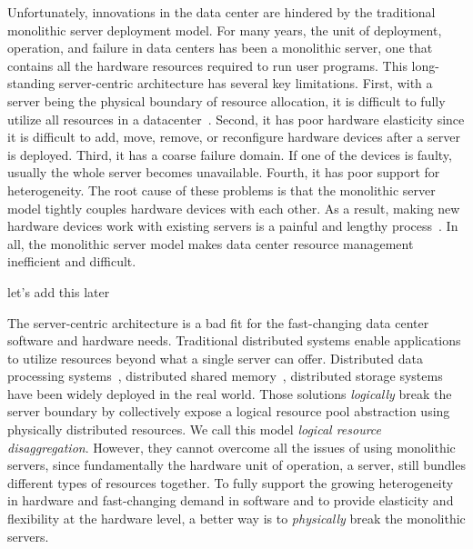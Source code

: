 Unfortunately, innovations in the data center are hindered by the traditional monolithic server deployment model.
For many years, the unit of deployment, operation, and failure in data centers
has been a monolithic server, one that contains all the hardware resources required to run user programs. 
%
This long-standing server-centric architecture has several key limitations.
First, with a server being the physical boundary of resource allocation, it is difficult to fully utilize all resources in a datacenter~\cite{LegoOS}.
Second, it has poor hardware elasticity since it is difficult to add, move, remove, or reconfigure hardware devices after a server is deployed.
Third, it has a coarse failure domain.
If one of the devices is faulty, usually the
whole server becomes unavailable.
Fourth, it has poor support for heterogeneity.
The root cause of these problems is that the monolithic server model tightly couples
hardware devices with each other.
As a result, making new hardware devices work with existing servers is a painful and lengthy process~\cite{Putnam14-FPGA}.
In all, the monolithic server model makes data center resource management inefficient and difficult.


let's add this later
\fi

The server-centric architecture is a bad fit for the fast-changing data center software and hardware needs.
Traditional distributed systems enable applications to utilize resources beyond what a single server can offer. Distributed data processing systems~\cite{Zaharia12-NSDI}, distributed shared memory~\cite{Nelson15-ATC, Li89-ACM}, distributed storage systems~\cite{calder11-azure,DeCandia+07-Dynamo,Ghemawat03-GoogleFS} have been widely deployed in the real world.
%
Those solutions \textit{logically} break the server boundary
by collectively expose a logical resource pool abstraction using physically distributed resources.
We call this model \textit{logical resource disaggregation}.
However, they cannot overcome all the issues of using monolithic servers,
since fundamentally the hardware unit of operation, a server, still bundles different types of resources together.
%
To fully support the growing heterogeneity in hardware and fast-changing demand in software and to provide elasticity and flexibility at the hardware level, a better way is to \textit{physically} break the monolithic servers.

